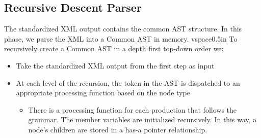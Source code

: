 \documentclass[thesis]{hmcposter}
\begin{document}
\begin{poster}
\section{Recursive Descent Parser}
The standardized XML output contains the common AST structure. In this phase, we parse the XML into a Common AST in memory.
vspace{0.5in}
To recursively create a Common AST in a depth first top-down order we:
\begin{itemize}
\item Take the standardized XML output from the first step as input
\item At each level of the recursion, the token in the AST is dispatched to an appropriate processing function based on the node type
	\begin{itemize}
	\item There is a processing function for each production that follows the grammar.
	The member variables are initialized recursively. In this way, a node's children are stored in a has-a pointer relationship. 
	\end{itemize}
\end{itemize}

\vspace{0.5in}

\begin{figure}
\begin{center}
\end{center}
\end{figure}


\end{poster}
\end{document}

